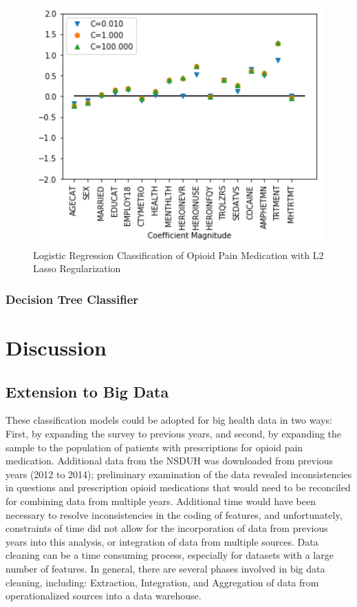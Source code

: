 \documentclass[sigconf]{acmart}
\begin{document}
\begin{figure}[!ht]
  \centering\includegraphics[width=\columnwidth]{images/Figure9.pdf}
  \caption{Logistic Regression Classification of Opioid Pain Medication
  with L2 Lasso Regularization}
  \label{f:Figure9}
\end{figure}

\cite{vanderplas17}

\subsubsection{Decision Tree Classifier\cite{muller17}}

\section{Discussion}

\subsection{Extension to Big Data}

These classification models could be adopted for big health data in two ways: 
First, by expanding the survey to previous years, and second, by expanding the 
sample to the population of patients with prescriptions for opioid pain 
medication. Additional data from the NSDUH was downloaded from previous years 
(2012 to 2014); preliminary examination of the data revealed inconsistencies 
in questions and prescription opioid medications that would need to be 
reconciled for combining data from multiple years. Additional time would have 
been necessary to resolve inconsistencies in the coding of features, and
unfortunately, constraints of time did not allow for the incorporation of data 
from previous years into this analysis, or integration of data from multiple 
sources. Data cleaning can be a time consuming process, especially for datasets 
with a large number of features. In general, there are several phases involved 
in big data cleaning, including: Extraction, Integration, and Aggregation of 
data from operationalized sources into a data warehouse.
\end{document}
